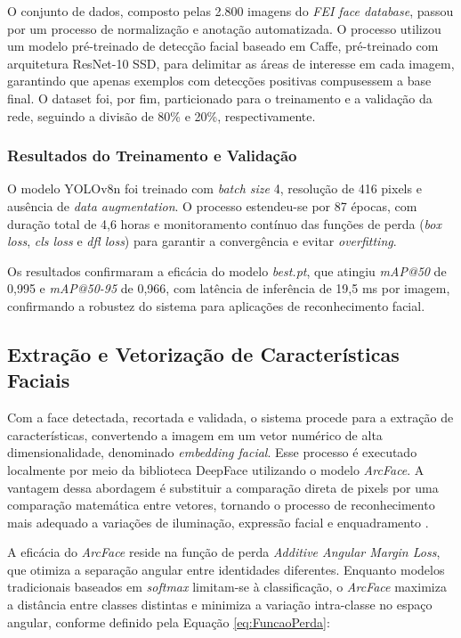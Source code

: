 O conjunto de dados, composto pelas 2.800 imagens do \textit{FEI face database}, passou por um processo de normalização e anotação automatizada. O processo utilizou um modelo pré-treinado de detecção facial baseado em Caffe, pré-treinado com arquitetura ResNet-10 SSD, para delimitar as áreas de interesse em cada imagem, garantindo que apenas exemplos com detecções positivas compusessem a base final. O dataset foi, por fim, particionado para o treinamento e a validação da rede, seguindo a divisão de 80\% e 20\%, respectivamente.


\subsubsection{Resultados do Treinamento e Validação}
O modelo YOLOv8n foi treinado com \textit{batch size} 4, resolução de 416 pixels e ausência de \textit{data augmentation}. O processo estendeu-se por 87 épocas, com duração total de 4,6 horas e monitoramento contínuo das funções de perda (\textit{box loss}, \textit{cls loss} e \textit{dfl loss}) para garantir a convergência e evitar \textit{overfitting}.

Os resultados confirmaram a eficácia do modelo \textit{best.pt}, que atingiu \textit{mAP@50} de 0,995 e \textit{mAP@50-95} de 0,966, com latência de inferência de 19,5 ms por imagem, confirmando a robustez do sistema para aplicações de reconhecimento facial.


\subsection{Extração e Vetorização de Características Faciais}

Com a face detectada, recortada e validada, o sistema procede para a extração de características, convertendo a imagem em um vetor numérico de alta dimensionalidade, denominado \textit{embedding facial}. Esse processo é executado localmente por meio da biblioteca DeepFace utilizando o modelo \textit{ArcFace}. A vantagem dessa abordagem é substituir a comparação direta de pixels por uma comparação matemática entre vetores, tornando o processo de reconhecimento mais adequado a variações de iluminação, expressão facial e enquadramento \cite{deepfacegithub}.

A eficácia do \textit{ArcFace} reside na função de perda \textit{Additive Angular Margin Loss}, que otimiza a separação angular entre identidades diferentes. Enquanto modelos tradicionais baseados em \textit{softmax} limitam-se à classificação, o \textit{ArcFace} maximiza a distância entre classes distintas e minimiza a variação intra-classe no espaço angular, conforme definido pela Equação \ref{eq:FuncaoPerda}:

